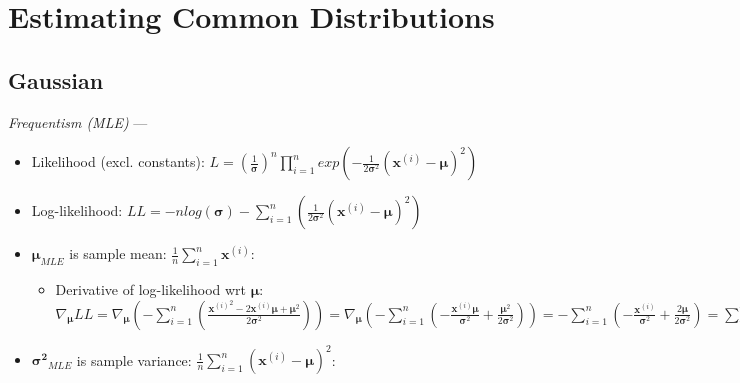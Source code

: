 \section{Estimating Common Distributions}
\subsection*{Gaussian}
\emph{Frequentism (MLE)} --- 
\begin{itemize}
    \item Likelihood (excl. constants): $L = (\frac{1}{\boldsymbol{\sigma}})^n \prod_{i=1}^n exp( -\frac{1}{2\boldsymbol{\sigma}^2} (\boldsymbol{x}^{(i)} - \boldsymbol{\mu} )^2)$
    \item Log-likelihood: $LL = -n log(\boldsymbol{\sigma}) - \sum_{i=1}^n (\frac{1}{2\boldsymbol{\sigma}^2} (\boldsymbol{x}^{(i)} - \boldsymbol{\mu} )^2)$
    \item $\boldsymbol{\mu}_{MLE}$ is sample mean: $ \frac{1}{n}\sum_{i=1}^n \boldsymbol{x}^{(i)}$:
    \begin{itemize}
        \item Derivative of log-likelihood wrt $\boldsymbol{\mu}$: $\nabla_{\boldsymbol{\mu}} LL = \nabla_{\boldsymbol{\mu}} (- \sum_{i=1}^n (\frac{{\boldsymbol{x}^{(i)}}^2 - 2 \boldsymbol{x}^{(i)} \boldsymbol{\mu} + \boldsymbol{\mu}^2}{2\boldsymbol{\sigma}^2})) = \nabla_{\boldsymbol{\mu}} (- \sum_{i=1}^n (-\frac{ \boldsymbol{x}^{(i)} \boldsymbol{\mu}}{\boldsymbol{\sigma}^2} + \frac{ \boldsymbol{\mu}^2}{2\boldsymbol{\sigma}^2} )) = - \sum_{i=1}^n (-\frac{ \boldsymbol{x}^{(i)}}{\boldsymbol{\sigma}^2} + \frac{ 2\boldsymbol{\mu}}{2\boldsymbol{\sigma}^2} ) =  \sum_{i=1}^n (\frac{ \boldsymbol{x}^{(i)} - \boldsymbol{\mu}}{\boldsymbol{\sigma}^2}) = \sum_{i=1}^n \boldsymbol{x}^{(i)} - n\boldsymbol{\mu} = 0 $
    \end{itemize}
    \item $\boldsymbol{\sigma^2}_{MLE}$ is sample variance: $ \frac{1}{n}\sum_{i=1}^n (\boldsymbol{x}^{(i)} - \boldsymbol{\mu})^2$:
\end{itemize}
